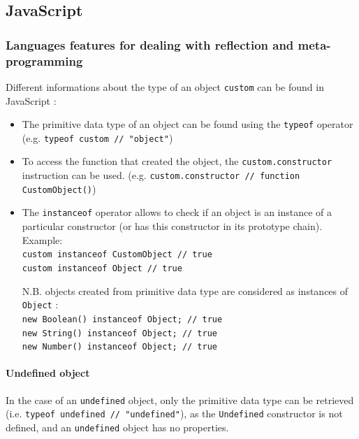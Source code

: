 \documentclass[a4paper,10pt]{article}
\begin{document}



\newpage
\subsection{JavaScript}

\setjs
\subsubsection{Languages features for dealing with reflection and meta-programming}

Different informations about the type of an object \lstinline|custom| can be found in JavaScript :
\begin{itemize}
\item The primitive data type of an object can be found using the \lstinline|typeof| operator (e.g. \lstinline|typeof custom // "object"|)

\item To access the function that created the object, the \lstinline|custom.constructor| instruction can be used. (e.g. \lstinline|custom.constructor // function CustomObject()|)

\item The \lstinline|instanceof| operator allows to check if an object is an instance of a particular constructor (or has this constructor in its prototype chain). \\
		Example: \\
		\lstinline|custom instanceof CustomObject // true| \\
		\lstinline|custom instanceof Object // true|

		\smallskip
		N.B. objects created from primitive data type are considered as instances of \lstinline|Object| : \\
		\lstinline|new Boolean() instanceof Object; // true| \\
		\lstinline|new String() instanceof Object; // true| \\
		\lstinline|new Number() instanceof Object; // true| \\
\end{itemize}


\paragraph{Undefined object}{
In the case of an \lstinline|undefined| object, only the primitive data type can be retrieved (i.e. \lstinline|typeof undefined // "undefined"|), as the \lstinline|Undefined| constructor is not defined, and an \lstinline|undefined| object has no properties.
}
\end{document}
